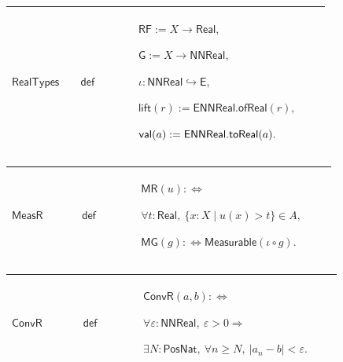\documentclass[12pt,reqno]{amsart}
\theoremstyle{blueplain}
\numberwithin{equation}{section}
\begin{document}
{\scriptsize \setlength{\parskip}{0pt}\nointerlineskip
\noindent 
\begin{tabular}{|@{}>{\centering\arraybackslash}m{0.19251\linewidth}|>{\centering\arraybackslash}m{0.16845\linewidth}|>{\centering\arraybackslash}m{0.53904\linewidth}|}
\hline
\hypertarget{dctdef:RealTypes}{$\displaystyle \mathsf{RealTypes}$} & $%
\displaystyle \mathsf{def}$ & $\displaystyle \mathsf{RF}:=X\to\mathsf{Real},$%
\par$\displaystyle \mathsf{G}:=X\to\mathsf{NNReal},$\par$\displaystyle \iota:%
\mathsf{NNReal}\hookrightarrow\mathsf{E},$\par$\displaystyle \mathsf{lift}%
(r):=\mathsf{ENNReal.ofReal}(r),$\par$\displaystyle \mathsf{val}(a):=\mathsf{%
ENNReal.toReal}(a).$ \\ \hline
\end{tabular}%
}

{\scriptsize \setlength{\parskip}{0pt}\nointerlineskip
\noindent 
\begin{tabular}{|@{}>{\centering\arraybackslash}m{0.19251\linewidth}|>{\centering\arraybackslash}m{0.16845\linewidth}|>{\centering\arraybackslash}m{0.53904\linewidth}|}
\hline
\hypertarget{dctdef:MeasR}{$\displaystyle \mathsf{MeasR}$} & $\displaystyle 
\mathsf{def}$ & $\displaystyle \mathsf{MR}(u):\Longleftrightarrow$\par$%
\displaystyle \forall t:\mathsf{Real},\ \{x:X\mid u(x)>t\}\in A,$\par$%
\displaystyle \mathsf{MG}(g):\Longleftrightarrow\mathsf{Measurable}%
(\iota\circ g).$ \\ \hline
\end{tabular}%
}

{\scriptsize \setlength{\parskip}{0pt}\nointerlineskip
\noindent 
\begin{tabular}{|@{}>{\centering\arraybackslash}m{0.19251\linewidth}|>{\centering\arraybackslash}m{0.16845\linewidth}|>{\centering\arraybackslash}m{0.53904\linewidth}|}
\hline
\hypertarget{dctdef:ConvR}{$\displaystyle \mathsf{ConvR}$} & $\displaystyle 
\mathsf{def}$ & $\displaystyle \mathsf{ConvR}(a,b):\Longleftrightarrow$\par$%
\displaystyle \forall\varepsilon:\mathsf{NNReal},\ \varepsilon>0\Rightarrow$%
\par$\displaystyle \exists N:\mathsf{PosNat},\ \forall n\ge N,\
|a_n-b|<\varepsilon.$ \\ \hline
\end{tabular}%
}
\end{document}

